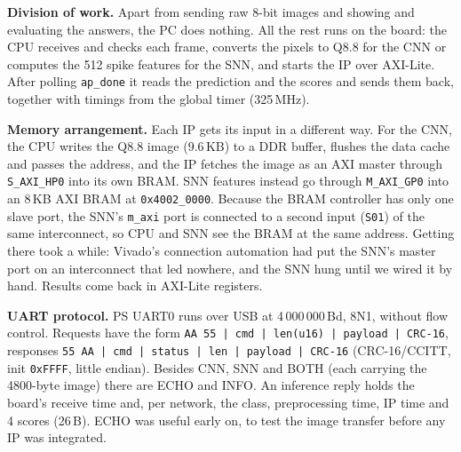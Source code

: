 \documentclass[10pt,a4paper]{article}
\begin{document}
\textbf{Division of work.} Apart from sending raw 8-bit images and showing and evaluating
the answers, the PC does nothing. All the rest runs on the board: the CPU receives and checks
each frame, converts the pixels to Q8.8 for the CNN or computes the 512 spike features for the
SNN, and starts the IP over AXI-Lite. After polling \texttt{ap\_done} it reads the prediction
and the scores and sends them back, together with timings from the global timer (325\,MHz).

\textbf{Memory arrangement.} Each IP gets its input in a different way. For the CNN, the
CPU writes the Q8.8 image (9.6\,KB) to a DDR buffer, flushes the data cache and passes the
address, and the IP fetches the image as an AXI master through \texttt{S\_AXI\_HP0} into its
own BRAM. SNN features instead go through \texttt{M\_AXI\_GP0} into an 8\,KB AXI BRAM at
\texttt{0x4002\_0000}. Because the BRAM controller has only one slave port, the SNN's
\texttt{m\_axi} port is connected to a second input (\texttt{S01}) of the same interconnect,
so CPU and SNN see the BRAM at the same address. Getting there took a while: Vivado's
connection automation had put the SNN's master port on an interconnect that led nowhere, and
the SNN hung until we wired it by hand. Results come back in AXI-Lite registers.

\textbf{UART protocol.} PS UART0 runs over USB at 4\,000\,000\,Bd, 8N1, without flow
control. Requests have the form \texttt{AA 55 | cmd | len(u16) | payload | CRC-16}, responses
\texttt{55 AA | cmd | status | len | payload | CRC-16} (CRC-16/CCITT, init \texttt{0xFFFF},
little endian). Besides CNN, SNN and BOTH (each carrying the 4800-byte image) there are ECHO and
INFO. An inference reply holds the board's receive time and, per network, the class,
preprocessing time, IP time and 4 scores (26\,B). ECHO was useful early on, to test the image
transfer before any IP was integrated.

\end{document}
